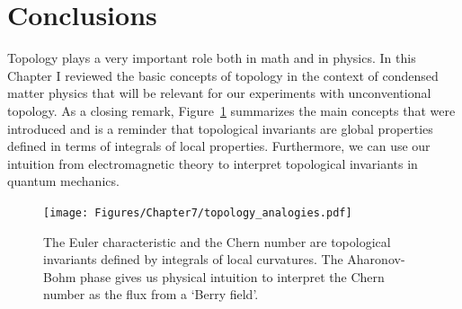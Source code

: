 









\section{Conclusions}

Topology plays a very important role both in math and in physics. In this Chapter I reviewed the basic concepts of topology in the context of condensed matter physics that will be relevant for our experiments with unconventional topology. As a closing remark, Figure~\ref{fig:topology_analogies} summarizes the main concepts that were introduced and is a reminder that topological invariants are global properties defined in terms of integrals of local properties. Furthermore, we can use our intuition from electromagnetic theory to interpret topological invariants in quantum mechanics. 

 \begin{figure}[htb]
\begin{center}
\texttt{[image: Figures/Chapter7/topology\_analogies.pdf]}
\caption[Different topological invariants]{The Euler characteristic and the Chern number are topological invariants defined by integrals of local curvatures. The Aharonov-Bohm phase gives us physical intuition to interpret the Chern number as the flux from a `Berry field'.}
\label{fig:topology_analogies}
\end{center}
\end{figure}

